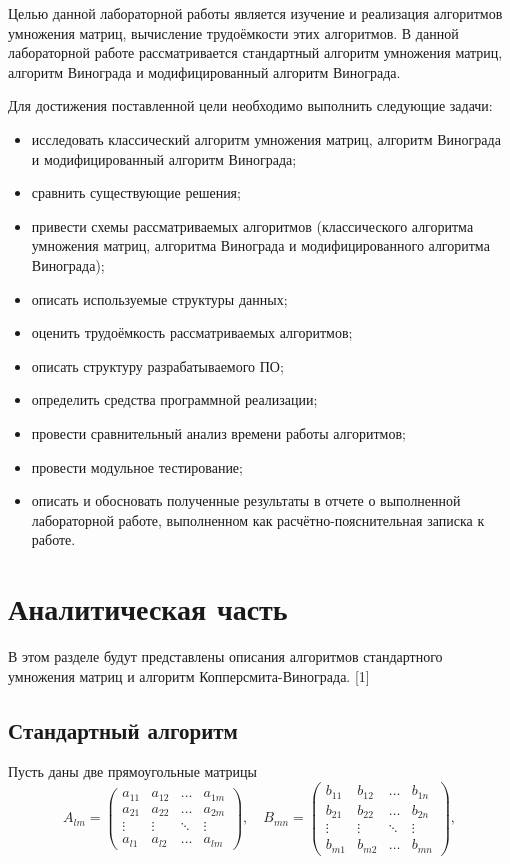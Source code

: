 \documentclass[a4paper,14pt, unknownkeysallowed]{extreport}
\begin{document}
Целью данной лабораторной работы является изучение и реализация алгоритмов
умножения матриц, вычисление трудоёмкости этих алгоритмов. В данной
лабораторной работе рассматривается стандартный алгоритм умножения
матриц, алгоритм Винограда и модифицированный алгоритм Винограда. 

Для достижения поставленной цели необходимо выполнить следующие задачи:

\begin{itemize}
	\item исследовать классический алгоритм умножения матриц, алгоритм Винограда и модифицированный алгоритм Винограда;
	\item сравнить существующие решения;
	\item привести схемы рассматриваемых алгоритмов (классического алгоритма умножения матриц, алгоритма Винограда и модифицированного алгоритма Винограда);
	\item описать используемые структуры данных;
	\item оценить трудоёмкость рассматриваемых алгоритмов;
	\item описать структуру разрабатываемого ПО;
	\item определить средства программной реализации;
	\item провести сравнительный анализ времени работы алгоритмов;
	\item провести модульное тестирование;
	\item описать и обосновать полученные результаты в отчете о выполненной лабораторной работе, выполненном как расчётно-пояснительная
	записка к работе.
\end{itemize}





\chapter{Аналитическая часть}
В этом разделе будут представлены описания алгоритмов стандартного умножения матриц и алгоритм Копперсмита-Винограда. [1]

\section{Стандартный алгоритм}

Пусть даны две прямоугольные матрицы
\begin{equation}
	A_{lm} = \begin{pmatrix}
		a_{11} & a_{12} & \ldots & a_{1m}\\
		a_{21} & a_{22} & \ldots & a_{2m}\\
		\vdots & \vdots & \ddots & \vdots\\
		a_{l1} & a_{l2} & \ldots & a_{lm}
	\end{pmatrix},
	\quad
	B_{mn} = \begin{pmatrix}
		b_{11} & b_{12} & \ldots & b_{1n}\\
		b_{21} & b_{22} & \ldots & b_{2n}\\
		\vdots & \vdots & \ddots & \vdots\\
		b_{m1} & b_{m2} & \ldots & b_{mn}
	\end{pmatrix},
\end{equation}
\end{document}
